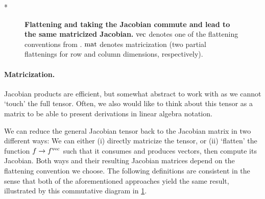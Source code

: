 \switchcolumn[1]*
\begin{figure}[!h]
  \centering
  \caption{\textbf{Flattening and taking the Jacobian commute and lead to the same matricized Jacobian.}
    $\vec$ denotes one of the flattening conventions from .
    $\mat$ denotes matricization (two partial flattenings for row and column dimensions, respectively).}\label{fig:commutative-diagram-jacobian}
\end{figure}
\switchcolumn[0]

\paragraph{Matricization.}
Jacobian products are efficient, but somewhat abstract to work with as we cannot `touch' the full tensor.
Often, we also would like to think about this tensor as a matrix to be able to present derivations in linear algebra notation.

We can reduce the general Jacobian tensor back to the Jacobian matrix in two different ways: We can either (i) directly matricize the tensor, or (ii) `flatten' the function $f \to f^{\vec}$ such that it consumes and produces vectors, then compute its Jacobian.
Both ways and their resulting Jacobian matrices depend on the flattening convention we choose.
The following definitions are consistent in the sense that both of the aforementioned approaches yield the same result, illustrated by this commutative diagram in \cref{fig:commutative-diagram-jacobian}.



